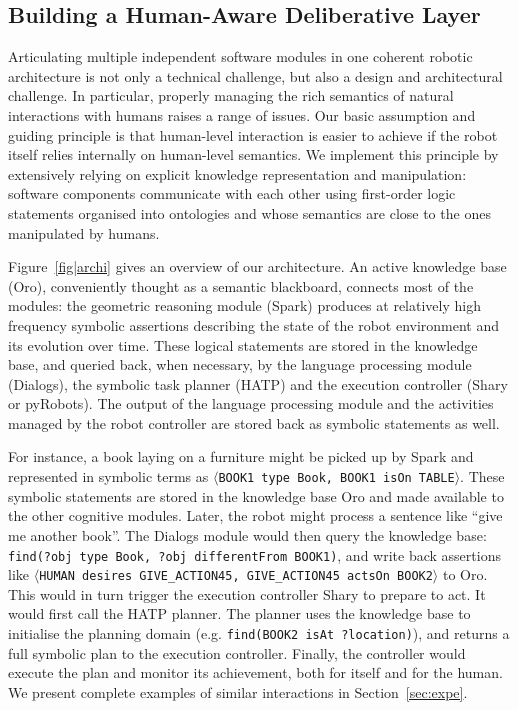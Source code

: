 \documentclass[preprint,3p,times]{elsarticle}
\newcommand{\stmt}[1]{{\footnotesize\tt$\langle$#1\relax$\rangle$}}
\newcommand{\eg}{e.g.\xspace}
\begin{document}
\subsection{Building a Human-Aware Deliberative Layer}

Articulating multiple independent software modules in one coherent robotic
architecture is not only a technical challenge, but also a design and
architectural challenge. In particular, properly managing the rich semantics of
natural interactions with humans raises a range of issues. Our basic assumption
and guiding principle is that human-level interaction is easier to achieve if
the robot itself relies internally on human-level semantics.  We implement this
principle by extensively relying on explicit knowledge representation and
manipulation: software components communicate with each other using first-order
logic statements organised into ontologies and whose semantics are close to the
ones manipulated by humans.

Figure~\ref{fig|archi} gives an overview of our architecture. An active
knowledge base ({\sc Oro}), conveniently thought as a semantic
blackboard, connects most of the modules: the geometric
reasoning module ({\sc Spark}) produces at relatively high frequency symbolic
assertions describing the state of the robot environment and its evolution over
time.  These logical statements are stored in the knowledge base, and queried
back, when necessary, by the language processing module ({\sc Dialogs}), the
symbolic task planner (HATP) and the execution controller ({\sc Shary} or {\sc
pyRobots}). The output of the language processing module and the activities
managed by the robot controller are stored back as symbolic statements as well.

For instance, a book laying on a furniture might be picked up by {\sc Spark} and
represented in symbolic terms as \stmt{BOOK1 type Book, BOOK1 isOn TABLE}. These
symbolic statements are stored in the knowledge base {\sc Oro} and made
available to the other cognitive modules. Later, the robot might process a
sentence like ``give me another book''. The {\sc Dialogs} module would then query the
knowledge base: {\tt \footnotesize find(?obj type Book, ?obj differentFrom
BOOK1)},
and write back assertions like \stmt{HUMAN desires GIVE\_ACTION45,
GIVE\_ACTION45 actsOn BOOK2} to {\sc Oro}. This would in turn trigger the
execution controller {\sc Shary} to prepare to act. It would first call the HATP
planner. The planner uses the knowledge base to initialise the planning domain (\eg
{\tt \footnotesize find(BOOK2 isAt ?location)}), and returns a full symbolic
plan to the execution controller. Finally, the controller would execute the plan and monitor
its achievement, both for itself and for the human. We present complete examples
of similar interactions in Section~\ref{sec:expe}.
\end{document}
